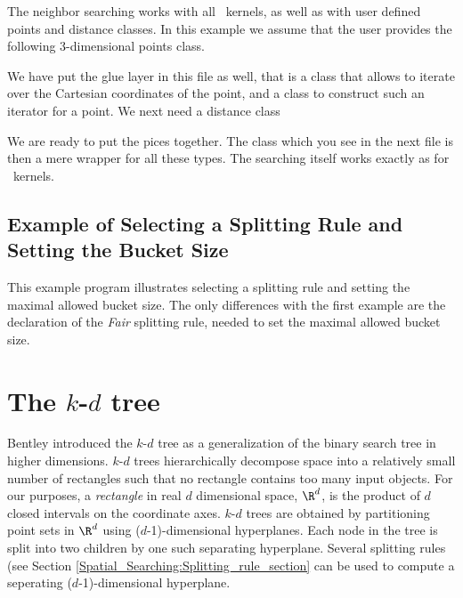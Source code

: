The neighbor searching works with all \cgal\ kernels, as well as with
user defined points and distance classes.
In this example we assume that the user provides the following 3-dimensional 
points class.


We have put the glue layer in this file as well, that is a class that allows to 
iterate over the Cartesian coordinates of the point, and a class to construct
such an iterator for a point. We next need a distance class
\newpage
{}

\newpage

We are ready to put the pices together.
The class  which you see in the next file is then a mere 
wrapper for all these types.  The searching itself works exactly as for \cgal\ kernels.


\newpage
\subsection{Example of Selecting a Splitting Rule and Setting the Bucket Size}

This example program illustrates selecting a splitting rule and
setting the maximal allowed bucket size.  The only differences with
the first example are the declaration of the {\em Fair} 
splitting rule, needed to set the maximal allowed bucket size.


\newpage

\section{The $k$-$d$ tree}
\label{Kd_tree_section}

Bentley \cite{b-mbstu-75} introduced the $k$-$d$ tree as a
generalization of the binary search tree in higher dimensions. $k$-$d$
trees hierarchically decompose space into a relatively small number of
rectangles such that no rectangle contains too many input objects.
For our purposes, a {\it rectangle} in real $d$ dimensional space,
$\R^d$, is the product of $d$ closed intervals on the coordinate axes.
$k$-$d$ trees are obtained by partitioning point sets in $\R^d$ using
($d$-1)-dimensional hyperplanes.  Each node in the tree is split into
two children by one such separating hyperplane.  Several splitting
rules (see Section \ref{Spatial_Searching:Splitting_rule_section} can
be used to compute a seperating ($d$-1)-dimensional hyperplane.

